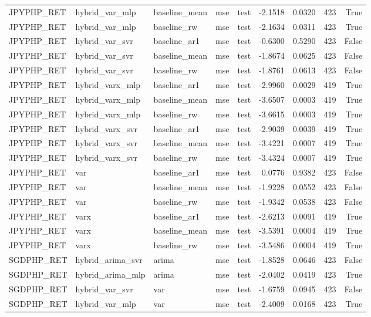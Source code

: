 \begin{tabular}{lllllrrrr}
JPYPHP_RET & hybrid_var_mlp & baseline_mean & mse & test & -2.1518 & 0.0320 & 423 & True \\
JPYPHP_RET & hybrid_var_mlp & baseline_rw & mse & test & -2.1634 & 0.0311 & 423 & True \\
JPYPHP_RET & hybrid_var_svr & baseline_ar1 & mse & test & -0.6300 & 0.5290 & 423 & False \\
JPYPHP_RET & hybrid_var_svr & baseline_mean & mse & test & -1.8674 & 0.0625 & 423 & False \\
JPYPHP_RET & hybrid_var_svr & baseline_rw & mse & test & -1.8761 & 0.0613 & 423 & False \\
JPYPHP_RET & hybrid_varx_mlp & baseline_ar1 & mse & test & -2.9960 & 0.0029 & 419 & True \\
JPYPHP_RET & hybrid_varx_mlp & baseline_mean & mse & test & -3.6507 & 0.0003 & 419 & True \\
JPYPHP_RET & hybrid_varx_mlp & baseline_rw & mse & test & -3.6615 & 0.0003 & 419 & True \\
JPYPHP_RET & hybrid_varx_svr & baseline_ar1 & mse & test & -2.9039 & 0.0039 & 419 & True \\
JPYPHP_RET & hybrid_varx_svr & baseline_mean & mse & test & -3.4221 & 0.0007 & 419 & True \\
JPYPHP_RET & hybrid_varx_svr & baseline_rw & mse & test & -3.4324 & 0.0007 & 419 & True \\
JPYPHP_RET & var & baseline_ar1 & mse & test & 0.0776 & 0.9382 & 423 & False \\
JPYPHP_RET & var & baseline_mean & mse & test & -1.9228 & 0.0552 & 423 & False \\
JPYPHP_RET & var & baseline_rw & mse & test & -1.9342 & 0.0538 & 423 & False \\
JPYPHP_RET & varx & baseline_ar1 & mse & test & -2.6213 & 0.0091 & 419 & True \\
JPYPHP_RET & varx & baseline_mean & mse & test & -3.5391 & 0.0004 & 419 & True \\
JPYPHP_RET & varx & baseline_rw & mse & test & -3.5486 & 0.0004 & 419 & True \\
SGDPHP_RET & hybrid_arima_svr & arima & mse & test & -1.8528 & 0.0646 & 423 & False \\
SGDPHP_RET & hybrid_arima_mlp & arima & mse & test & -2.0402 & 0.0419 & 423 & True \\
SGDPHP_RET & hybrid_var_svr & var & mse & test & -1.6759 & 0.0945 & 423 & False \\
SGDPHP_RET & hybrid_var_mlp & var & mse & test & -2.4009 & 0.0168 & 423 & True \\

\end{tabular}
